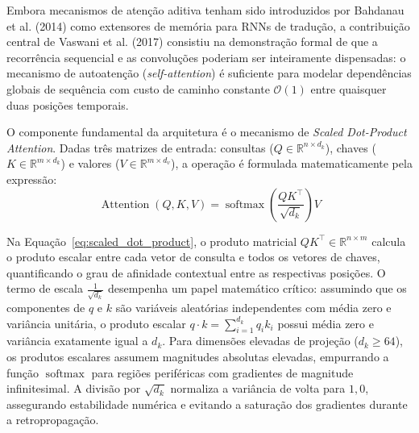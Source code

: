 \documentclass[10pt,a4paper,twocolumn]{article}
\begin{document}
Embora mecanismos de aten\c{c}\~ao aditiva tenham sido introduzidos por Bahdanau et al. (2014) como extensores de mem\'oria para RNNs de tradu\c{c}\~ao, a contribui\c{c}\~ao central de Vaswani et al. (2017) consistiu na demonstra\c{c}\~ao formal de que a recorr\^encia sequencial e as convolu\c{c}\~oes poderiam ser inteiramente dispensadas: o mecanismo de autoaten\c{c}\~ao (\emph{self-attention}) \'e suficiente para modelar depend\^encias globais de sequ\^encia com custo de caminho constante $\mathcal{O}(1)$ entre quaisquer duas posi\c{c}\~oes temporais.

O componente fundamental da arquitetura \'e o mecanismo de \emph{Scaled Dot-Product Attention}. Dadas tr\^es matrizes de entrada: consultas ($Q \in \mathbb{R}^{n \times d_k}$), chaves ($K \in \mathbb{R}^{m \times d_k}$) e valores ($V \in \mathbb{R}^{m \times d_v}$), a opera\c{c}\~ao \'e formulada matematicamente pela express\~ao:
\begin{equation}
\operatorname{Attention}(Q,K,V) = \operatorname{softmax}\left(\frac{QK^\top}{\sqrt{d_k}}\right)V
\label{eq:scaled_dot_product}
\end{equation}

Na Equa\c{c}\~ao~\eqref{eq:scaled_dot_product}, o produto matricial $QK^\top \in \mathbb{R}^{n \times m}$ calcula o produto escalar entre cada vetor de consulta e todos os vetores de chaves, quantificando o grau de afinidade contextual entre as respectivas posi\c{c}\~oes. O termo de escala $\frac{1}{\sqrt{d_k}}$ desempenha um papel matem\'atico cr\'itico: assumindo que os componentes de $q$ e $k$ s\~ao vari\'aveis aleat\'orias independentes com m\'edia zero e vari\^ancia unit\'aria, o produto escalar $q \cdot k = \sum_{i=1}^{d_k} q_i k_i$ possui m\'edia zero e vari\^ancia exatamente igual a $d_k$. Para dimens\~oes elevadas de proje\c{c}\~ao ($d_k \ge 64$), os produtos escalares assumem magnitudes absolutas elevadas, empurrando a fun\c{c}\~ao $\operatorname{softmax}$ para regi\~oes perif\'ericas com gradientes de magnitude infinitesimal. A divis\~ao por $\sqrt{d_k}$ normaliza a vari\^ancia de volta para $1,0$, assegurando estabilidade num\'erica e evitando a satura\c{c}\~ao dos gradientes durante a retropropaga\c{c}\~ao.
\end{document}
